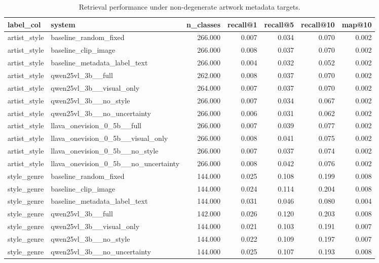 \begin{table}
\caption{Retrieval performance under non-degenerate artwork metadata targets.}
\label{tab:retrieval_fixed}
\begin{tabular}{llrrrrr}
\toprule
label_col & system & n_classes & recall@1 & recall@5 & recall@10 & map@10 \\
\midrule
artist_style & baseline_random_fixed & 266.000 & 0.007 & 0.034 & 0.070 & 0.002 \\
artist_style & baseline_clip_image & 266.000 & 0.008 & 0.037 & 0.070 & 0.002 \\
artist_style & baseline_metadata_label_text & 266.000 & 0.004 & 0.032 & 0.052 & 0.002 \\
artist_style & qwen25vl_3b__full & 262.000 & 0.008 & 0.037 & 0.070 & 0.002 \\
artist_style & qwen25vl_3b__visual_only & 264.000 & 0.007 & 0.037 & 0.070 & 0.002 \\
artist_style & qwen25vl_3b__no_style & 266.000 & 0.007 & 0.034 & 0.067 & 0.002 \\
artist_style & qwen25vl_3b__no_uncertainty & 266.000 & 0.006 & 0.031 & 0.062 & 0.002 \\
artist_style & llava_onevision_0_5b__full & 266.000 & 0.007 & 0.039 & 0.077 & 0.002 \\
artist_style & llava_onevision_0_5b__visual_only & 266.000 & 0.008 & 0.041 & 0.075 & 0.002 \\
artist_style & llava_onevision_0_5b__no_style & 266.000 & 0.007 & 0.037 & 0.074 & 0.002 \\
artist_style & llava_onevision_0_5b__no_uncertainty & 266.000 & 0.008 & 0.042 & 0.076 & 0.002 \\
style_genre & baseline_random_fixed & 144.000 & 0.025 & 0.108 & 0.199 & 0.008 \\
style_genre & baseline_clip_image & 144.000 & 0.024 & 0.114 & 0.204 & 0.008 \\
style_genre & baseline_metadata_label_text & 144.000 & 0.031 & 0.046 & 0.080 & 0.004 \\
style_genre & qwen25vl_3b__full & 142.000 & 0.026 & 0.120 & 0.203 & 0.008 \\
style_genre & qwen25vl_3b__visual_only & 144.000 & 0.021 & 0.103 & 0.191 & 0.007 \\
style_genre & qwen25vl_3b__no_style & 144.000 & 0.022 & 0.109 & 0.197 & 0.007 \\
style_genre & qwen25vl_3b__no_uncertainty & 144.000 & 0.025 & 0.107 & 0.193 & 0.008 \\

\end{tabular}
\end{table}
